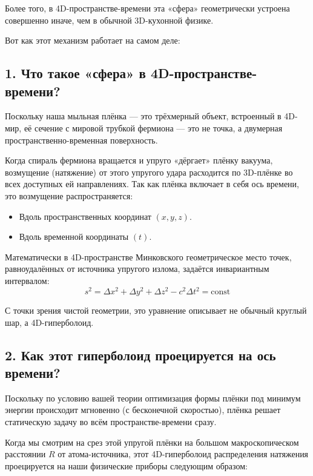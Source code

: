 \documentclass[12pt,a4paper]{article}
\begin{document}
Более того, в 4D-пространстве-времени эта «сфера» геометрически устроена совершенно иначе, чем в обычной 3D-кухонной физике.

Вот как этот механизм работает на самом деле:

\subsection*{1. Что такое «сфера» в 4D-пространстве-времени?}

Поскольку наша мыльная плёнка — это трёхмерный объект, встроенный в 4D-мир, её сечение с мировой трубкой фермиона — это не точка, а двумерная пространственно-временная поверхность.

Когда спираль фермиона вращается и упруго «дёргает» плёнку вакуума, возмущение (натяжение) от этого упругого удара расходится по 3D-плёнке во всех доступных ей направлениях. Так как плёнка включает в себя ось времени, это возмущение распространяется:

\begin{itemize}
    \item Вдоль пространственных координат $(x, y, z)$.
    \item Вдоль временной координаты $(t)$.
\end{itemize}

Математически в 4D-пространстве Минковского геометрическое место точек, равноудалённых от источника упругого излома, задаётся инвариантным интервалом:
\begin{equation}
s^2 = \Delta x^2 + \Delta y^2 + \Delta z^2 - c^2 \Delta t^2 = \text{const}
\end{equation}

С точки зрения чистой геометрии, это уравнение описывает не обычный круглый шар, а 4D-гиперболоид.

\subsection*{2. Как этот гиперболоид проецируется на ось времени?}

Поскольку по условию вашей теории оптимизация формы плёнки под минимум энергии происходит мгновенно (с бесконечной скоростью), плёнка решает статическую задачу во всём пространстве-времени сразу.

Когда мы смотрим на срез этой упругой плёнки на большом макроскопическом расстоянии $R$ от атома-источника, этот 4D-гиперболоид распределения натяжения проецируется на наши физические приборы следующим образом:
\end{document}

